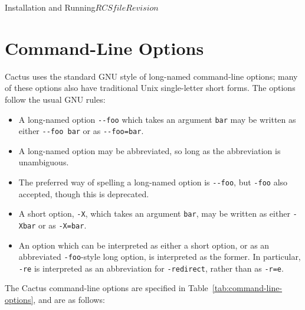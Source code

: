\begin{cactuspart}{Installation and Running}{$RCSfile$}{$Revision$}
\section{Command-Line Options}
\label{sec:command_line_options}

Cactus uses the standard GNU style of long-named command-line options;
many of these options also have traditional Unix single-letter short forms.
The options follow the usual GNU rules:
\begin{itemize}
\item	A long-named option \verb|--foo| which takes an argument \verb|bar|
	may be written as either \verb|--foo bar| or as \verb|--foo=bar|.
\item	A long-named option may be abbreviated, so long as the abbreviation
	is unambiguous.
\item	The preferred way of spelling a long-named option is \verb|--foo|,
	but \verb|-foo| also accepted, though this is deprecated.
\item	A short option, \verb|-X|, which takes an argument \verb|bar|,
	may be written as either \verb|-Xbar| or as \verb|-X=bar|.
\item	An option which can be interpreted as either a short option,
	or as an abbreviated \verb|-foo|-style long option, is interpreted
	as the former.  In particular, \verb|-re| is interpreted as
	an abbreviation for \verb|-redirect|, rather than as \verb|-r=e|.
\end{itemize}

The Cactus command-line options are specified in
Table~\ref{tab:command-line-options}, and are as follows:


\end{cactuspart}
